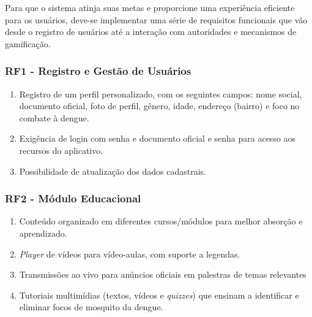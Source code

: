 \documentclass[a5paper, 12pt]{article}
\begin{document}
    Para que o sistema atinja suas metas e proporcione uma experiência eficiente para os usuários, deve-se implementar uma série de requisitos funcionais que vão desde o registro de usuários até a interação com autoridades e mecanismos de gamificação.
    
    \subsubsection{RF1 - Registro e Gestão de Usuários}
    \begin{enumerate}
        \item Registro de um perfil personalizado, com os seguintes campos: nome social, documento oficial, foto de perfil, gênero, idade, endereço (bairro) e foco no combate à dengue.
        \item Exigência de login com senha e documento oficial e senha para acesso aos recursos do aplicativo.
        \item Possibilidade de atualização dos dados cadastrais.
    \end{enumerate}
    
    \subsubsection{RF2 - Módulo Educacional}
    \begin{enumerate}
        \item Conteúdo organizado em diferentes cursos/módulos para melhor absorção e aprendizado.
        \item \textit{Player} de vídeos para vídeo-aulas, com suporte a legendas.
        \item Transmissões ao vivo para anúncios oficiais em palestras de temas relevantes
        \item Tutoriais multimídias (textos, vídeos e \textit{quizzes}) que ensinam a identificar e eliminar focos de mosquito da dengue.
    \end{enumerate}
    
\end{document}
